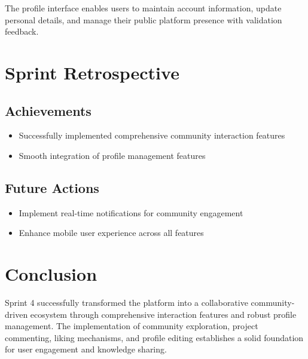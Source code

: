 The profile interface enables users to maintain account information, update personal details, and manage their public platform presence with validation feedback.

\section{Sprint Retrospective}

\subsection{Achievements}
\begin{itemize}
\item Successfully implemented comprehensive community interaction features
\item Smooth integration of profile management features
\end{itemize}


\subsection{Future Actions}
\begin{itemize}
\item Implement real-time notifications for community engagement
\item Enhance mobile user experience across all features
\end{itemize}

\section{Conclusion}

Sprint 4 successfully transformed the platform into a collaborative community-driven ecosystem through comprehensive interaction features and robust profile management. The implementation of community exploration, project commenting, liking mechanisms, and profile editing establishes a solid foundation for user engagement and knowledge sharing.

